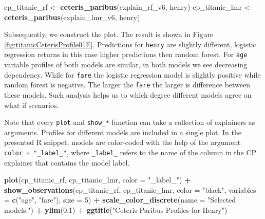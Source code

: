 \documentclass[12pt,]{krantz}
\newenvironment{Shaded}{\begin{snugshade}}{\end{snugshade}}
\newcommand{\DataTypeTok}[1]{\textcolor[rgb]{0.13,0.29,0.53}{#1}}
\newcommand{\DecValTok}[1]{\textcolor[rgb]{0.00,0.00,0.81}{#1}}
\newcommand{\KeywordTok}[1]{\textcolor[rgb]{0.13,0.29,0.53}{\textbf{#1}}}
\newcommand{\NormalTok}[1]{#1}
\newcommand{\OperatorTok}[1]{\textcolor[rgb]{0.81,0.36,0.00}{\textbf{#1}}}
\newcommand{\StringTok}[1]{\textcolor[rgb]{0.31,0.60,0.02}{#1}}
\theoremstyle{definition}
\theoremstyle{definition}
\theoremstyle{definition}
\theoremstyle{remark}
\begin{document}
\begin{Shaded}
\begin{Highlighting}[]
\NormalTok{cp_titanic_rf <-}\StringTok{ }\KeywordTok{ceteris_paribus}\NormalTok{(explain_rf_v6, henry)}
\NormalTok{cp_titanic_lmr <-}\StringTok{ }\KeywordTok{ceteris_paribus}\NormalTok{(explain_lmr_v6, henry)}
\end{Highlighting}
\end{Shaded}

Subsequently, we construct the plot. The result is shown in Figure
\ref{fig:titanicCeterisProfile01E}. Predictions for \texttt{henry} are
slightly different, logistic regression returns in this case higher
predictions then random forest. For \texttt{age} variable profiles of
both models are similar, in both models we see decreasing dependency.
While for \texttt{fare} the logistic regression model is slightly
positive while random forest is negative. The larger the \texttt{fare}
the larger is difference between these models. Such analysis helps us to
which degree different models agree on what if scenarios.

Note that every \texttt{plot} and \texttt{show\_*} function can take a
collection of explainers as arguments. Profiles for different models are
included in a single plot. In the presented R snippet, models are
color-coded with the help of the argument
\texttt{color\ =\ "\_label\_"}, where \texttt{\_label\_} refers to the
name of the column in the CP explainer that contains the model label.

\begin{Shaded}
\begin{Highlighting}[]
\KeywordTok{plot}\NormalTok{(cp_titanic_rf, cp_titanic_lmr, }\DataTypeTok{color =} \StringTok{"_label_"}\NormalTok{) }\OperatorTok{+}
\StringTok{  }\KeywordTok{show_observations}\NormalTok{(cp_titanic_rf, cp_titanic_lmr, }\DataTypeTok{color =} \StringTok{"black"}\NormalTok{, }\DataTypeTok{variables =} \KeywordTok{c}\NormalTok{(}\StringTok{"age"}\NormalTok{, }\StringTok{"fare"}\NormalTok{), }\DataTypeTok{size =} \DecValTok{5}\NormalTok{) }\OperatorTok{+}
\StringTok{  }\KeywordTok{scale_color_discrete}\NormalTok{(}\DataTypeTok{name =} \StringTok{"Selected models:"}\NormalTok{) }\OperatorTok{+}\StringTok{ }\KeywordTok{ylim}\NormalTok{(}\DecValTok{0}\NormalTok{,}\DecValTok{1}\NormalTok{) }\OperatorTok{+}\StringTok{ }
\StringTok{  }\KeywordTok{ggtitle}\NormalTok{(}\StringTok{"Ceteris Paribus Profiles for Henry"}\NormalTok{)}
\end{Highlighting}
\end{Shaded}
\end{document}
